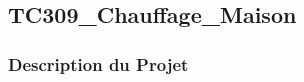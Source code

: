 \documentclass[a4paper,12pt]{report}
\begin{document}
\newpage
\subsection{TC309\_Chauffage\_Maison}
\begin{center}
\label{}
\end{center}
\subsubsection{Description du Projet}
\end{document}
